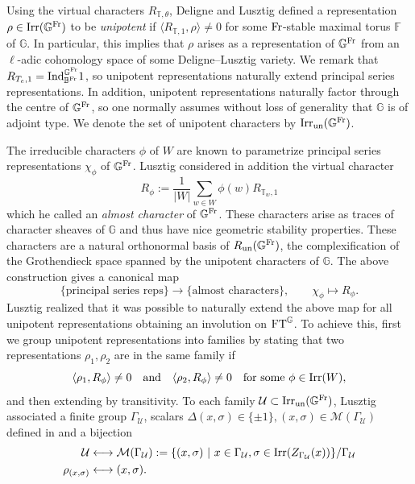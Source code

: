 Using the virtual characters $R_{\mathbb{T},\theta}$, Deligne and Lusztig defined a representation $\rho\in\mathrm{Irr}(\mathbb{G}^{\mathrm{Fr}})$ to be \textit{unipotent} if $\langle R_{\mathbb{T},1},\rho\rangle\neq 0$ for some $\mathrm{Fr}$-stable maximal torus $\mathbb{F}$ of $\mathbb{G}$. In particular, this implies that $\rho$ arises as a representation of $\mathbb{G}^{\mathrm{Fr}}$ from an $\ell$-adic cohomology space of some Deligne--Lusztig variety. We remark that $R_{T_e,1}=\mathrm{Ind}_{\mathbb{B}^\mathrm{\mathrm{Fr}}}^{\mathbb{G}^{\mathrm{Fr}}}1$, so unipotent representations naturally extend principal series representations. In addition, unipotent representations naturally factor through the centre of $\mathbb{G}^{\mathrm{Fr}}$, so one normally assumes without loss of generality that $\mathbb{G}$ is of adjoint type. We denote the set of unipotent characters by $\mathrm{Irr}_{\mathrm{un}}(\mathbb{G}^{\mathrm{Fr}})$.

The irreducible characters $\phi$ of $W$ are known to parametrize principal series representations $\chi_\phi$ of $\mathbb{G}^{\mathrm{Fr}}$. Lusztig considered in addition the virtual character 
$$R_\phi:=\frac{1}{|W|}\sum_{w\in W}\phi(w)R_{\mathbb{T}_w,1}$$
which he called an \textit{almost character} of $\mathbb{G}^{\mathrm{Fr}}$. These characters arise as traces of character sheaves of $\mathbb{G}$ and thus have nice geometric stability properties. These characters are a natural orthonormal basis of $R_{\mathrm{un}}(\mathbb{G}^{\mathrm{Fr}})$, the complexification of the Grothendieck space spanned by the unipotent characters of $\mathbb{G}$. The above construction gives a canonical map
\begin{equation*}
    \{\text{principal series reps}\}\longrightarrow\{\text{almost characters}\},\quad\quad\chi_\phi\longmapsto R_\phi.
\end{equation*} 
Lusztig realized that it was possible to naturally extend the above map for all unipotent representations obtaining an involution on $\mathrm{FT}^{\mathbb{G}}$. To achieve this, first we group unipotent representations into families by stating that two representations $\rho_1,\rho_2$ are in the same family if 
$$\langle\rho_1,R_\phi\rangle\neq0\quad\text{and}\quad\langle\rho_2,R_\phi\rangle\neq0\quad\text{for some }\phi\in\mathrm{Irr}(W),$$
and then extending by transitivity. To each family $\mathcal{U}\subset\mathrm{Irr}_{\mathrm{un}}(\mathbb{G}^{\mathrm{Fr}})$, Lusztig associated a finite group $\Gamma_\mathcal{U}$, scalars $\Delta(x,\sigma)\in\{\pm1\}, (x,\sigma)\in\mathcal{M}(\Gamma_\mathcal{U})$ defined in \cite{Lusztig1984} and a bijection
\begin{align*}
    \mathcal{U}&\longleftrightarrow\mathcal{M}(\Gamma_\mathcal{U}):=\{(x,\sigma)\ |\ x\in\Gamma_\mathcal{U},\sigma\in\Irr(Z_{\Gamma_{\mathcal{U}}}(x))\}/\Gamma_\mathcal{U}\\
    \rho_{(x,\sigma)}&\longleftrightarrow(x,\sigma).
\end{align*}
